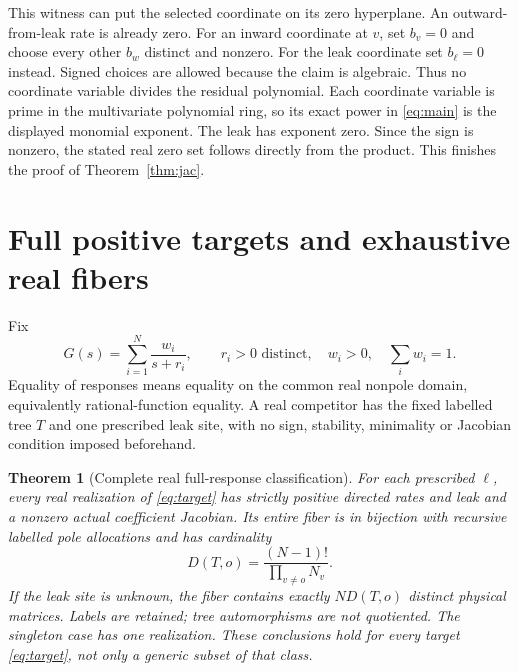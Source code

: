 \documentclass[11pt]{article}
\newtheorem{theorem}{Theorem}
\theoremstyle{remark}
\newcommand{\1}{\mathbf 1}
\begin{document}
This witness can put the selected coordinate on its zero hyperplane.
An outward-from-leak rate is already zero. For an inward coordinate at $v$,
set $b_v=0$ and choose every other $b_w$ distinct and nonzero.
For the leak coordinate set $b_\ell=0$ instead. Signed choices are allowed
because the claim is algebraic. Thus no coordinate variable divides the
residual polynomial. Each coordinate variable is prime in the multivariate
polynomial ring, so its exact power in \eqref{eq:main} is the displayed
monomial exponent. The leak has exponent zero. Since the sign is nonzero,
the stated real zero set follows directly from the product. This finishes
the proof of Theorem~\ref{thm:jac}.

\section{Full positive targets and exhaustive real fibers}
Fix
\begin{equation}\label{eq:target}
 G(s)=\sum_{i=1}^N\frac{w_i}{s+r_i},\qquad
 r_i>0\text{ distinct},\quad w_i>0,\quad\sum_iw_i=1.
\end{equation}
Equality of responses means equality on the common real nonpole domain,
equivalently rational-function equality. A real competitor has the fixed
labelled tree $T$ and one prescribed leak site, with no sign, stability,
minimality or Jacobian condition imposed beforehand.

\begin{theorem}[Complete real full-response classification]\label{thm:fiber}
For each prescribed $\ell$, every real realization of \eqref{eq:target}
has strictly positive directed rates and leak and a nonzero actual
coefficient Jacobian. Its entire fiber is in bijection with recursive labelled
pole allocations and has cardinality
\begin{equation}\label{eq:count}
 D(T,o)=\frac{(N-1)!}{\prod_{v\ne o}N_v}.
\end{equation}
If the leak site is unknown, the fiber contains exactly $N D(T,o)$ distinct
physical matrices. Labels are retained; tree automorphisms are not quotiented.
The singleton case has one realization. These conclusions hold for every
target \eqref{eq:target}, not only a generic subset of that class.
\end{theorem}
\end{document}

